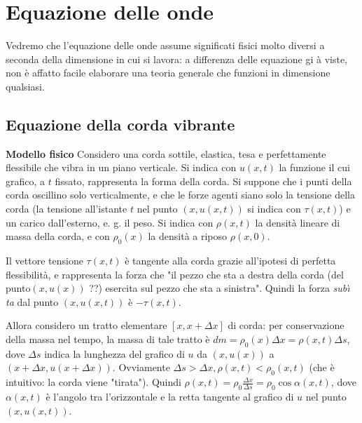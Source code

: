 \documentclass{article}
\begin{document}
\section{Equazione delle onde}

Vedremo che l'equazione delle onde assume significati fisici molto diversi a
seconda della dimensione in cui si lavora: a differenza delle equazione gi%
\`{a} viste, non \`{e} affatto facile elaborare una teoria generale che
funzioni in dimensione qualsiasi.

\subsection{Equazione della corda vibrante}

\textbf{Modello fisico} Considero una corda sottile, elastica, tesa e
perfettamente flessibile che vibra in un piano verticale. Si indica con $%
u\left( x,t\right) $ la funzione il cui grafico, a $t$ fissato, rappresenta
la forma della corda. Si suppone che i punti della corda oscillino solo
verticalmente, e che le forze agenti siano solo la tensione della corda (la
tensione all'istante $t$ nel punto $\left( x,u\left( x,t\right) \right) $ si
indica con $\tau \left( x,t\right) $) e un carico dall'esterno, e. g. il
peso. Si indica con $\rho \left( x,t\right) $ la densit\`{a} lineare di
massa della corda, e con $\rho _{0}\left( x\right) $ la densit\`{a} a riposo 
$\rho \left( x,0\right) $.

Il vettore tensione $\tau \left( x,t\right) $ \`{e} tangente alla corda
grazie all'ipotesi di perfetta flessibilit\`{a}, e rappresenta la forza che
"il pezzo che sta a destra della corda (del punto$\left( x,u\left( x\right) \right) $%
??) esercita sul pezzo che sta a sinistra". Quindi la forza \textit{sub\`{\i}%
ta} dal punto $\left( x,u\left( x,t\right) \right) $ \`{e} $-\tau \left(
x,t\right) $.

Allora considero un tratto elementare $\left[ x,x+\Delta x\right] $ di
corda: per conservazione della massa nel tempo, la massa di tale tratto \`{e}
$dm=\rho _{0}\left( x\right) \Delta x=\rho \left( x,t\right) \Delta s$, dove 
$\Delta s$ indica la lunghezza del grafico di $u$ da $\left( x,u\left(
x\right) \right) $ a $\left( x+\Delta x,u\left( x+\Delta x\right) \right) $.
Ovviamente $\Delta s>\Delta x,\rho \left( x,t\right) <\rho _{0}\left(
x,t\right) $ (che \`{e} intuitivo: la corda viene "tirata"). Quindi $\rho
\left( x,t\right) =\rho _{0}\frac{\Delta x}{\Delta s}=\rho _{0}\cos \alpha
\left( x,t\right) $, dove $\alpha \left( x,t\right) $ \`{e} l'angolo tra
l'orizzontale e la retta tangente al grafico di $u$ nel punto $\left(
x,u\left( x,t\right) \right) $.
\end{document}
